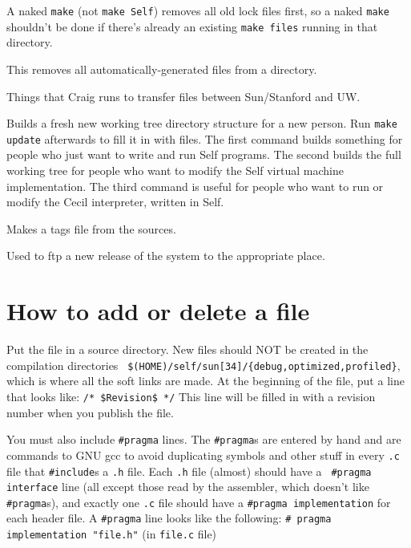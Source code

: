 \begin{description}
A naked {\tt make} (not {\tt make Self}) removes all old lock files
first, so a naked {\tt make} shouldn't be done if there's already an
existing {\tt make files} running in that directory.

This removes all automatically-generated files from a directory.

Things that Craig runs to transfer files between Sun/Stanford and UW.

Builds a fresh new working tree directory structure for a new person.
Run {\tt make update} afterwards to fill it in with files.  The first
command builds something for people who just want to write and run
Self programs.  The second builds the full working tree for people who
want to modify the Self virtual machine implementation.  The third
command is useful for people who want to run or modify the Cecil
interpreter, written in Self.

Makes a tags file from the sources.

Used to ftp a new release of the system to the appropriate place.

\end{description}


\section{How to add or delete a file}
Put the file in a source directory.  New files should NOT be created
in the compilation directories {\tt
\$(HOME)/self/sun[34]/\{debug,optimized,profiled\}}, which is where
all the soft links are made.  At the beginning of the file, put a line
that looks like:
\bq
	{\tt /* \$Revision\$ */}
\eq
This line will be filled in with a revision number when you publish the file.

You must also include {\tt \#pragma} lines.  The {\tt \#pragma}s are
entered by hand and are commands to GNU gcc to avoid duplicating
symbols and other stuff in every {\tt .c} file that {\tt \#include}s a
{\tt .h} file.  Each {\tt .h} file (almost) should have a {\tt
\#pragma interface} line (all except those read by the assembler,
which doesn't like {\tt \#pragma}s), and exactly one {\tt .c} file
should have a {\tt \#pragma implementation} for each header file.  A
{\tt \#pragma} line looks like the following:
\bq
	{\tt\# pragma implementation "file.h"} (in {\tt file.c} file)

